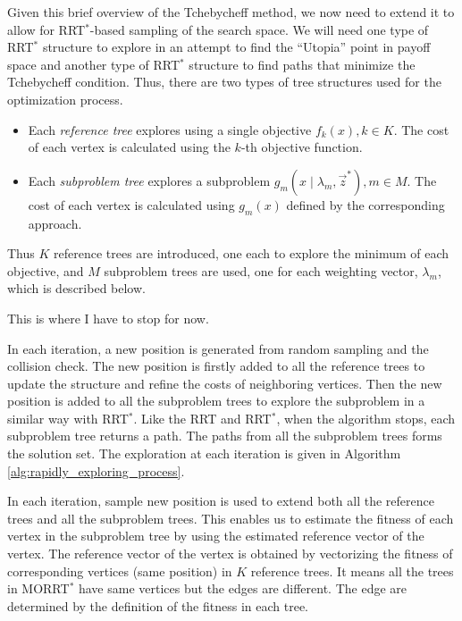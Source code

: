 \documentclass[conference]{IEEEtran}
\begin{document}

Given this brief overview of the Tchebycheff method, we now need to extend it to allow for RRT$^{*}$-based sampling of the search space.  
We will need one type of RRT$^{*}$ structure to explore in an attempt to find the ``Utopia'' point in payoff space and another type of RRT$^{*}$ structure to find paths that minimize the Tchebycheff condition.  
Thus, there are two types of tree structures used for the optimization process.
\begin{itemize}
\item Each \emph{reference tree} explores using a single objective $ f_{k} (x), k \in K $. 
The cost of each vertex is calculated using the $ k $-th objective function.
\item Each \emph{subproblem tree} explores a subproblem $ g_{m} ( x \mid \lambda_{m} , \vec{z}^{*} ) , m \in M $.
The cost of each vertex is calculated using $ g_{m}(x) $ defined by the corresponding approach.
\end{itemize}
Thus $ K $ reference trees are introduced, one each to explore the minimum of each objective, and $ M $ subproblem trees are used, one for each weighting vector, $ \lambda_{m} $, which is described below.

{\sc This is where I have to stop for now.}

In each iteration, a new position is generated from random sampling and the collision check.
The new position is firstly added to all the reference trees to update the structure and refine the costs of neighboring vertices.
Then the new position is added to all the subproblem trees to explore the subproblem in a similar way with RRT$^{*}$.
Like the RRT and RRT$^{*}$, when the algorithm stops, each subproblem tree returns a path.
The paths from all the subproblem trees forms the solution set.
The exploration at each iteration is given in Algorithm \ref{alg:rapidly_exploring_process}.

In each iteration, sample new position is used to extend both all the reference trees and all the subproblem trees.
This enables us to estimate the fitness of each vertex in the subproblem tree by using the estimated reference vector of the vertex.
The reference vector of the vertex is obtained by vectorizing the fitness of corresponding vertices (same position) in $ K $ reference trees.
It means all the trees in MORRT$^{*}$ have same vertices but the edges are different.
The edge are determined by the definition of the fitness in each tree.
\end{document}
